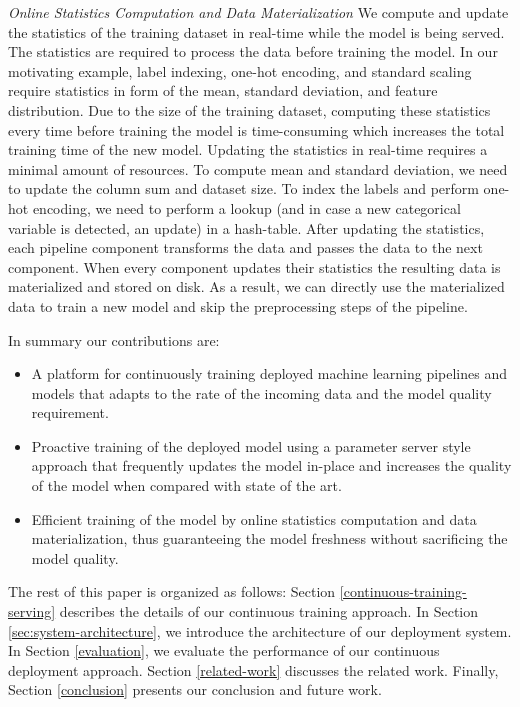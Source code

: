 \textit{Online Statistics Computation and Data Materialization}
We compute and update the statistics of the training dataset in real-time while the model is being served. 
The statistics are required to process the data before training the model.
In our motivating example, label indexing, one-hot encoding, 
and standard scaling require statistics in form of the mean, standard deviation, and feature distribution.
Due to the size of the training dataset, computing these statistics every time before training the model is time-consuming which increases the total training time of the new model.
Updating the statistics in real-time requires a minimal amount of resources. 
To compute mean and standard deviation, we need to update the column sum and dataset size.
To index the labels and perform one-hot encoding, we need to perform a lookup (and in case a new categorical variable is detected, an update) in a hash-table. 
After updating the statistics, each pipeline component transforms the data and passes the data to the next component.
When every component updates their statistics the resulting data is materialized and stored on disk.
As a result, we can directly use the materialized data to train a new model and skip the preprocessing steps of the pipeline.

In summary our contributions are:
\begin{itemize}
\item A platform for continuously training deployed machine learning pipelines and models that adapts to the rate of the incoming data and the model quality requirement.
\item Proactive training of the deployed model using a parameter server style approach that frequently updates the model in-place and increases the quality of the model when compared with state of the art.
\item Efficient training of the model by online statistics computation and data materialization, thus guaranteeing the model freshness without sacrificing the model quality.
\end{itemize}

The rest of this paper is organized as follows:
Section \ref{continuous-training-serving} describes the details of our continuous training approach.
In Section \ref{sec:system-architecture}, we introduce the architecture of our deployment system.
In Section \ref{evaluation}, we evaluate the performance of our continuous deployment approach.
Section \ref {related-work} discusses the related work.
Finally, Section \ref{conclusion} presents our conclusion and future work.
